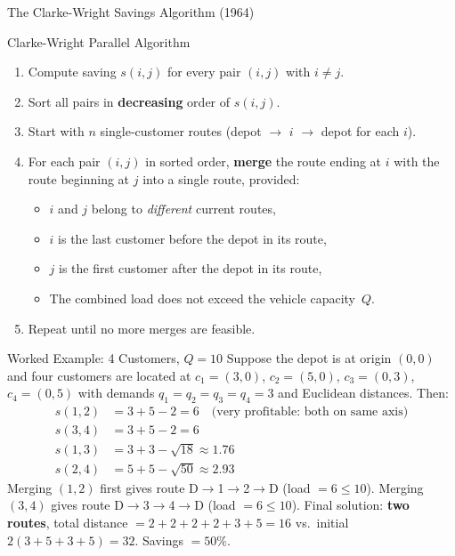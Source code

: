 \documentclass[aspectratio=169,10pt]{beamer}
\begin{document}
\begin{frame}[allowframebreaks]{The Clarke-Wright Savings Algorithm (1964)}
  \framebreak

  \begin{block}{Clarke-Wright Parallel Algorithm}
    \begin{enumerate}
      \item Compute saving $s(i,j)$ for every pair $(i,j)$ with $i \ne j$.
      \item Sort all pairs in \textbf{decreasing} order of $s(i,j)$.
      \item Start with $n$ single-customer routes
            (depot $\to$ $i$ $\to$ depot for each $i$).
      \item For each pair $(i,j)$ in sorted order, \textbf{merge} the route
            ending at $i$ with the route beginning at $j$ into a single
            route, provided:
        \begin{itemize}
          \item $i$ and $j$ belong to \emph{different} current routes,
          \item $i$ is the last customer before the depot in its route,
          \item $j$ is the first customer after the depot in its route,
          \item The combined load does not exceed the vehicle capacity~$Q$.
        \end{itemize}
      \item Repeat until no more merges are feasible.
    \end{enumerate}
  \end{block}

  \begin{exampleblock}{Worked Example: 4 Customers, $Q = 10$}
    Suppose the depot is at origin $(0,0)$ and four customers are located
    at $c_1=(3,0)$, $c_2=(5,0)$, $c_3=(0,3)$, $c_4=(0,5)$ with demands
    $q_1=q_2=q_3=q_4=3$ and Euclidean distances.  Then:
    \begin{align*}
      s(1,2) &= 3 + 5 - 2 = 6 \quad \text{(very profitable: both on same axis)}\\
      s(3,4) &= 3 + 5 - 2 = 6 \\
      s(1,3) &= 3 + 3 - \sqrt{18} \approx 1.76 \\
      s(2,4) &= 5 + 5 - \sqrt{50} \approx 2.93
    \end{align*}
    Merging $(1,2)$ first gives route D$\to$1$\to$2$\to$D (load $=6 \le 10$).
    Merging $(3,4)$ gives route D$\to$3$\to$4$\to$D (load $=6 \le 10$).
    Final solution: \textbf{two routes}, total distance $= 2+2+2+2+3+5= 16$
    vs.\ initial $2(3+5+3+5)=32$.  Savings $= 50\%$.
  \end{exampleblock}


\end{frame}
\end{document}

